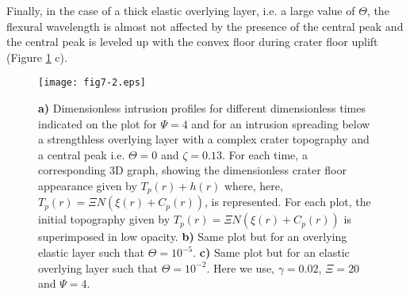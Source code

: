 Finally, in the case of a  thick elastic overlying layer, i.e. a large
value of $\Theta$,  the flexural wavelength is almost  not affected by
the presence  of the central peak  and the central peak  is leveled up
with   the   convex  floor   during   crater   floor  uplift   (Figure
\ref{C5-fig7-2} c).
\begin{figure}[h!]
  \begin{center}
    \graphicspath{{/Users/thorey/Documents/These/Submission/Article/FFC_JGR_2013/Paper_APRES_2nd_REVIEW/}}
    \texttt{[image: fig7-2.eps]}
    \caption{   \textbf{a)}  Dimensionless   intrusion  profiles   for
      different dimensionless times indicated on the plot for $\Psi=4$
      and for  an intrusion  spreading below a  strengthless overlying
      layer  with  a complex  crater  topography  and a  central  peak
      i.e. $\Theta=0$ and $\zeta=0.13$. For each time, a corresponding
      3D  graph, showing  the  dimensionless  crater floor  appearance
      given        by         $T_p(r)+h(r)$        where,        here,
      $T_p(r)=\Xi  N(\xi(r)+C_p(r))$,  is represented.  For  each
      plot,      the       initial      topography       given      by
      $T_p(r)=\Xi  N(\xi(r)+C_p(r))$   is  superimposed   in  low
      opacity.  \textbf{b)} Same  plot  but for  an overlying  elastic
      layer such that $\Theta=10^{-5}$.  \textbf{c)} Same plot but for
      an elastic  overlying layer such that  $\Theta=10^{-2}$. Here we
      use, $\gamma=0.02$, $\Xi=20$ and $\Psi=4$.}
    \label{C5-fig7-2}
  \end{center}
\end{figure}


